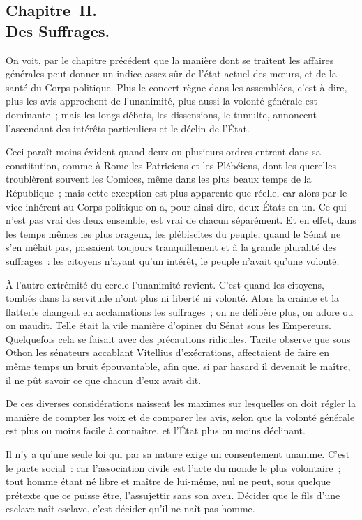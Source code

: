 \documentclass[french,twoside]{book} %
\begin{document}
\subsection[{Chapitre II. Des Suffrages.}]{Chapitre II. \\
Des Suffrages.}
\noindent On voit, par le chapitre précédent que la manière dont se traitent les affaires générales peut donner un indice assez sûr de l’état actuel des mœurs, et de la santé du Corps politique. Plus le concert règne dans les assemblées, c’est-à-dire, plus les avis approchent de l’unanimité, plus aussi la volonté générale est dominante ; mais les longs débats, les dissensions, le tumulte, annoncent l’ascendant des intérêts particuliers et le déclin de l’État.\par
Ceci paraît moins évident quand deux ou plusieurs ordres entrent dans sa constitution, comme à Rome les Patriciens et les Plébéiens, dont les querelles troublèrent souvent les Comices, même dans les plus beaux temps de la République ; mais cette exception est plus apparente que réelle, car alors par le vice inhérent au Corps politique on a, pour ainsi dire, deux États en un. Ce qui n’est pas vrai des deux ensemble, est vrai de chacun séparément. Et en effet, dans les temps mêmes les plus orageux, les plébiscites du peuple, quand le Sénat ne s’en mêlait pas, passaient toujours tranquillement et à la grande pluralité des suffrages : les citoyens n’ayant qu’un intérêt, le peuple n’avait qu’une volonté.\par
À l’autre extrémité du cercle l’unanimité revient. C’est quand les citoyens, tombés dans la servitude n’ont plus ni liberté ni volonté. Alors la crainte et la flatterie changent en acclamations les suffrages ; on ne délibère plus, on adore ou on maudit. Telle était la vile manière d’opiner du Sénat sous les Empereurs. Quelquefois cela se faisait avec des précautions ridicules. Tacite observe que sous Othon les sénateurs accablant Vitellius d’exécrations, affectaient de faire en même temps un bruit épouvantable, afin que, si par hasard il devenait le maître, il ne pût savoir ce que chacun d’eux avait dit.\par
De ces diverses considérations naissent les maximes sur lesquelles on doit régler la manière de compter les voix et de comparer les avis, selon que la volonté générale est plus ou moins facile à connaître, et l’État plus ou moins déclinant.\par
Il n’y a qu’une seule loi qui par sa nature exige un consentement unanime. C’est le pacte social : car l’association civile est l’acte du monde le plus volontaire ; tout homme étant né libre et maître de lui-même, nul ne peut, sous quelque prétexte que ce puisse être, l’assujettir sans son aveu. Décider que le fils d’une esclave naît esclave, c’est décider qu’il ne naît pas homme.\par
\end{document}

